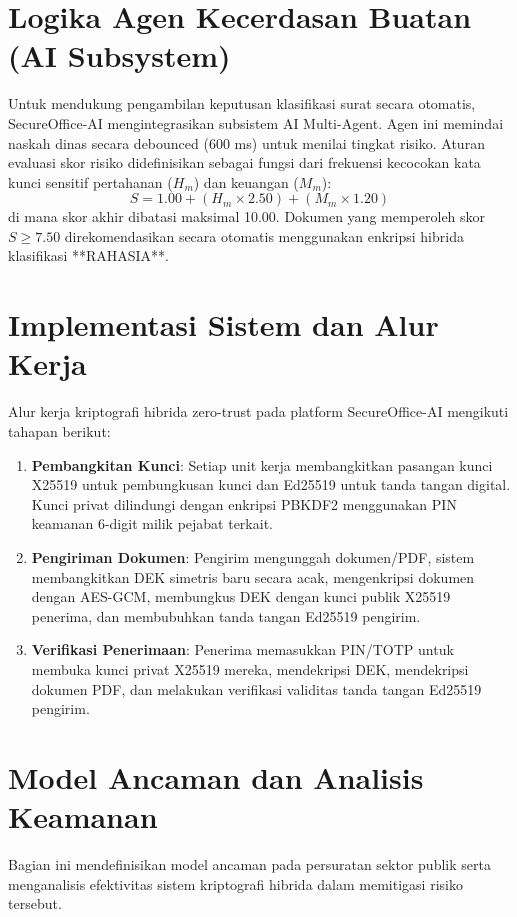 \documentclass[conference]{IEEEtran}
\begin{document}
\section{Logika Agen Kecerdasan Buatan (AI Subsystem)}
Untuk mendukung pengambilan keputusan klasifikasi surat secara otomatis, SecureOffice-AI mengintegrasikan subsistem AI Multi-Agent. Agen ini memindai naskah dinas secara debounced (600 ms) untuk menilai tingkat risiko.
Aturan evaluasi skor risiko didefinisikan sebagai fungsi dari frekuensi kecocokan kata kunci sensitif pertahanan ($H_m$) dan keuangan ($M_m$):
\begin{equation}
S = 1.00 + (H_m \times 2.50) + (M_m \times 1.20)
\end{equation}
di mana skor akhir dibatasi maksimal 10.00. Dokumen yang memperoleh skor $S \geq 7.50$ direkomendasikan secara otomatis menggunakan enkripsi hibrida klasifikasi **RAHASIA**.

\section{Implementasi Sistem dan Alur Kerja}
Alur kerja kriptografi hibrida zero-trust pada platform SecureOffice-AI mengikuti tahapan berikut:

\begin{enumerate}
    \item \textbf{Pembangkitan Kunci}: Setiap unit kerja membangkitkan pasangan kunci X25519 untuk pembungkusan kunci dan Ed25519 untuk tanda tangan digital. Kunci privat dilindungi dengan enkripsi PBKDF2 menggunakan PIN keamanan 6-digit milik pejabat terkait.
    \item \textbf{Pengiriman Dokumen}: Pengirim mengunggah dokumen/PDF, sistem membangkitkan DEK simetris baru secara acak, mengenkripsi dokumen dengan AES-GCM, membungkus DEK dengan kunci publik X25519 penerima, dan membubuhkan tanda tangan Ed25519 pengirim.
    \item \textbf{Verifikasi Penerimaan}: Penerima memasukkan PIN/TOTP untuk membuka kunci privat X25519 mereka, mendekripsi DEK, mendekripsi dokumen PDF, dan melakukan verifikasi validitas tanda tangan Ed25519 pengirim.
\end{enumerate}

\section{Model Ancaman dan Analisis Keamanan}
Bagian ini mendefinisikan model ancaman pada persuratan sektor publik serta menganalisis efektivitas sistem kriptografi hibrida dalam memitigasi risiko tersebut.
\end{document}
